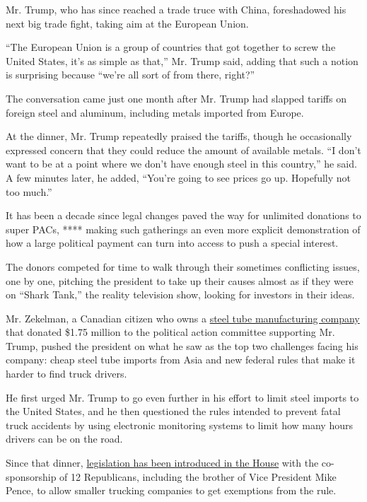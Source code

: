 Mr. Trump, who has since reached a trade truce with China, foreshadowed
his next big trade fight, taking aim at the European Union.

``The European Union is a group of countries that got together to screw
the United States, it's as simple as that,'' Mr. Trump said, adding that
such a notion is surprising because ``we're all sort of from there,
right?''

The conversation came just one month after Mr. Trump had slapped tariffs
on foreign steel and aluminum, including metals imported from Europe.

At the dinner, Mr. Trump repeatedly praised the tariffs, though he
occasionally expressed concern that they could reduce the amount of
available metals. ``I don't want to be at a point where we don't have
enough steel in this country,'' he said. A few minutes later, he added,
``You're going to see prices go up. Hopefully not too much.''

It has been a decade since legal changes paved the way for unlimited
donations to super PACs, **** making such gatherings an even more
explicit demonstration of how a large political payment can turn into
access to push a special interest.

The donors competed for time to walk through their sometimes conflicting
issues, one by one, pitching the president to take up their causes
almost as if they were on ``Shark Tank,'' the reality television show,
looking for investors in their ideas.

Mr. Zekelman, a Canadian citizen who owns a
\href{https://www.zekelman.com/company/management-team/barry-zekelman/}{steel
tube manufacturing company} that donated \$1.75 million to the political
action committee supporting Mr. Trump, pushed the president on what he
saw as the top two challenges facing his company: cheap steel tube
imports from Asia and new federal rules that make it harder to find
truck drivers.

He first urged Mr. Trump to go even further in his effort to limit steel
imports to the United States, and he then questioned the rules intended
to prevent fatal truck accidents by using electronic monitoring systems
to limit how many hours drivers can be on the road.

Since that dinner,
\href{https://www.congress.gov/bill/116th-congress/house-bill/1697?q=\%7B\%22search\%22\%3A\%5B\%22S.+1463\%22\%5D\%7D\&s=1\&r=51}{legislation
has been introduced in the House} with the co-sponsorship of 12
Republicans, including the brother of Vice President Mike Pence, to
allow smaller trucking companies to get exemptions from the rule.

